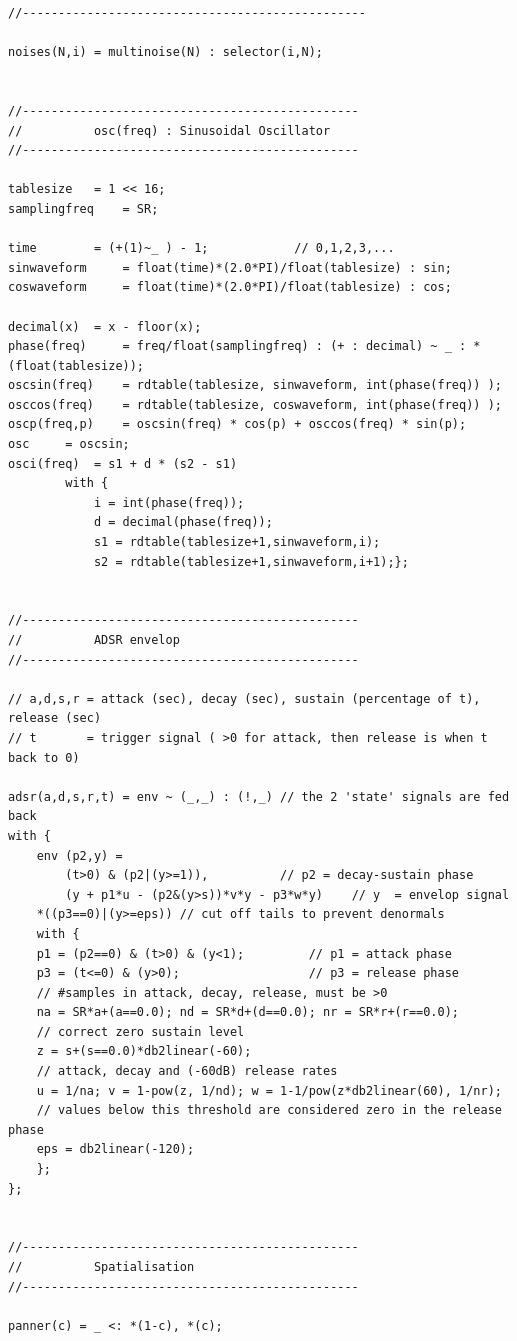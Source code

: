 \documentclass{article}
\begin{document}
\begin{lstlisting}[caption=\texttt{music.lib}]
//------------------------------------------------

noises(N,i) = multinoise(N) : selector(i,N);
 

//-----------------------------------------------
// 			osc(freq) : Sinusoidal Oscillator
//-----------------------------------------------

tablesize 	= 1 << 16;
samplingfreq	= SR;

time 		= (+(1)~_ ) - 1; 			// 0,1,2,3,...
sinwaveform 	= float(time)*(2.0*PI)/float(tablesize) : sin;
coswaveform 	= float(time)*(2.0*PI)/float(tablesize) : cos;

decimal(x)	= x - floor(x);
phase(freq) 	= freq/float(samplingfreq) : (+ : decimal) ~ _ : *(float(tablesize));
oscsin(freq)	= rdtable(tablesize, sinwaveform, int(phase(freq)) );
osccos(freq)	= rdtable(tablesize, coswaveform, int(phase(freq)) );
oscp(freq,p)	= oscsin(freq) * cos(p) + osccos(freq) * sin(p);
osc		= oscsin;
osci(freq)	= s1 + d * (s2 - s1)
		with {
			i = int(phase(freq));
			d = decimal(phase(freq));
			s1 = rdtable(tablesize+1,sinwaveform,i);
			s2 = rdtable(tablesize+1,sinwaveform,i+1);};


//-----------------------------------------------
// 			ADSR envelop
//-----------------------------------------------

// a,d,s,r = attack (sec), decay (sec), sustain (percentage of t), release (sec)
// t       = trigger signal ( >0 for attack, then release is when t back to 0)

adsr(a,d,s,r,t) = env ~ (_,_) : (!,_) // the 2 'state' signals are fed back
with {
    env (p2,y) =
        (t>0) & (p2|(y>=1)),          // p2 = decay-sustain phase
        (y + p1*u - (p2&(y>s))*v*y - p3*w*y)	// y  = envelop signal
	*((p3==0)|(y>=eps)) // cut off tails to prevent denormals
    with {
	p1 = (p2==0) & (t>0) & (y<1);         // p1 = attack phase
	p3 = (t<=0) & (y>0);                  // p3 = release phase
	// #samples in attack, decay, release, must be >0
	na = SR*a+(a==0.0); nd = SR*d+(d==0.0); nr = SR*r+(r==0.0);
	// correct zero sustain level
	z = s+(s==0.0)*db2linear(-60);
	// attack, decay and (-60dB) release rates
	u = 1/na; v = 1-pow(z, 1/nd); w = 1-1/pow(z*db2linear(60), 1/nr);
	// values below this threshold are considered zero in the release phase
	eps = db2linear(-120);
    };
};


//-----------------------------------------------
// 			Spatialisation
//-----------------------------------------------

panner(c) = _ <: *(1-c), *(c);


\end{lstlisting}
\end{document}
